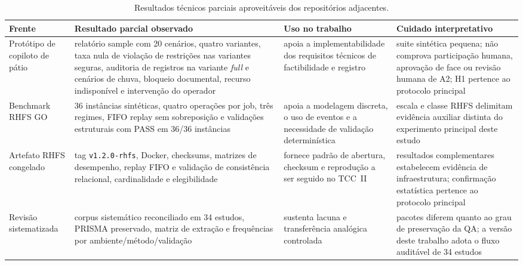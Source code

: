 \documentclass[
  12pt,
  oneside,
  a4paper,
  sumario=tradicional,
  brazil
]{abntex2}
\begin{document}
\begin{apendicesenv}
\begin{table}[H]
\centering
\scriptsize
\setlength{\tabcolsep}{4pt}
\renewcommand{\arraystretch}{1.16}
\begin{tabularx}{\textwidth}{@{}P{0.22\textwidth}P{0.28\textwidth}YY@{}}
\toprule
{}
\textbf{Frente} & \textbf{Resultado parcial observado} & \textbf{Uso no trabalho} & \textbf{Cuidado interpretativo} \\
\midrule
Prot\'otipo de copiloto de p\'atio & relat\'orio sample com 20 cen\'arios, quatro variantes, taxa nula de viola\c{c}\~ao de restri\c{c}\~oes nas variantes seguras, auditoria de registros na variante \textit{full} e cen\'arios de chuva, bloqueio documental, recurso indispon\'ivel e interven\c{c}\~ao do operador & apoia a implementabilidade dos requisitos t\'ecnicos de factibilidade e registro & suite sint\'etica pequena; n\~ao comprova participa\c{c}\~ao humana, aprova\c{c}\~ao de face ou revis\~ao humana de A2; H1 pertence ao protocolo principal \\
\addlinespace
Benchmark RHFS GO & 36 inst\^ancias sint\'eticas, quatro opera\c{c}\~oes por job, tr\^es regimes, FIFO replay sem sobreposi\c{c}\~ao e valida\c{c}\~oes estruturais com PASS em 36/36 inst\^ancias & apoia a modelagem discreta, o uso de eventos e a necessidade de valida\c{c}\~ao determin\'istica & escala e classe RHFS delimitam evid\^encia auxiliar distinta do experimento principal deste estudo \\
\addlinespace
Artefato RHFS congelado & tag \texttt{v1.2.0-rhfs}, Docker, checksums, matrizes de desempenho, replay FIFO e valida\c{c}\~ao de consist\^encia relacional, cardinalidade e elegibilidade & fornece padr\~ao de abertura, checksum e reprodu\c{c}\~ao a ser seguido no TCC~II & resultados complementares estabelecem evid\^encia de infraestrutura; confirma\c{c}\~ao estat\'istica pertence ao protocolo principal \\
\addlinespace
Revis\~ao sistematizada & corpus sistem\'atico reconciliado em 34 estudos, PRISMA preservado, matriz de extra\c{c}\~ao e frequ\^encias por ambiente/m\'etodo/valida\c{c}\~ao & sustenta lacuna e transfer\^encia anal\'ogica controlada & pacotes diferem quanto ao grau de preserva\c{c}\~ao da QA; a vers\~ao deste trabalho adota o fluxo audit\'avel de 34 estudos \\
\bottomrule
\end{tabularx}
\caption[Resultados t\'ecnicos parciais]{Resultados t\'ecnicos parciais aproveit\'aveis dos reposit\'orios adjacentes.}
\label{tab:resultados-repos-adjacentes}
\end{table}


\end{apendicesenv}
\end{document}
